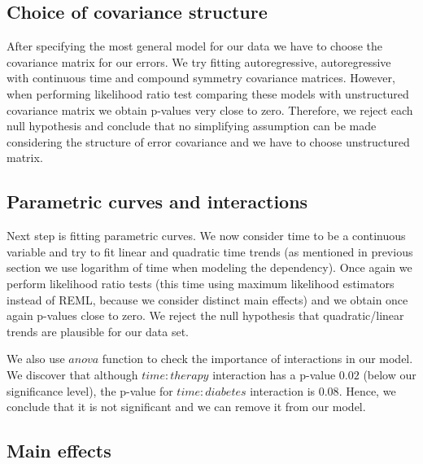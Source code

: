 \documentclass[num-refs]{wiley-article}
\begin{document}
\subsection{Choice of covariance structure}
After specifying the most general model for our data we have to choose the covariance matrix for our errors. We try fitting autoregressive, autoregressive with continuous time and compound symmetry covariance matrices. However, when performing likelihood ratio test comparing these models with unstructured covariance matrix we obtain p-values very close to zero. Therefore, we reject each null hypothesis and conclude that no simplifying assumption can be made considering the structure of error covariance and we have to choose  unstructured matrix.

\subsection{Parametric curves and interactions}

Next step is fitting parametric curves. We now consider time to be a continuous variable and try to fit linear and quadratic time trends (as mentioned in previous section we use logarithm of time when modeling the dependency). Once  again we perform likelihood ratio tests (this time using maximum likelihood estimators instead of REML, because we consider distinct main effects) and we obtain once again p-values close to zero. We reject the null hypothesis that quadratic/linear trends are plausible for our data set. 

We also use $anova$ function to check the importance of interactions in our model. We discover that although $time:therapy$ interaction has a p-value $0.02$ (below our significance level), the p-value for $time:diabetes$ interaction is $0.08$. Hence, we conclude that it is not significant and we can remove it from our model.

\subsection{Main effects}
\end{document}

